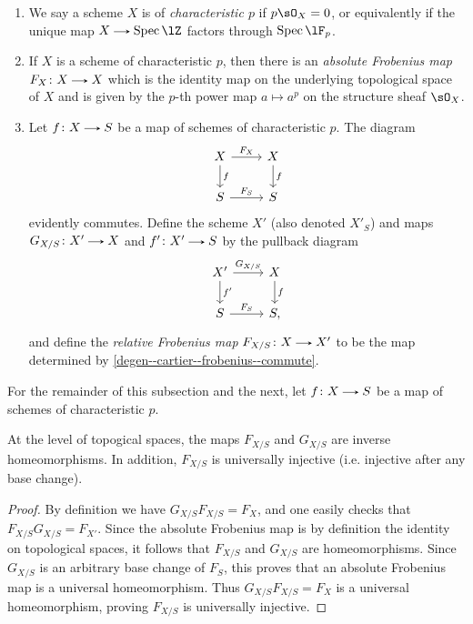 \begin{definition}
  \label{degen--cartier--frobenius}
  \begin{enumerate}[leftmargin=*]
  \item We say a scheme $X$ is of \emph{characteristic $p$} if $p\sO_X = 0$, or equivalently if the unique map $X \to \Spec \lZ$ factors through $\Spec \lF_p$.
  \item If $X$ is a scheme of characteristic $p$, then there is an \emph{ absolute Frobenius map} $F_X \c X \to X$ which is the identity map on the underlying topological space of $X$ and is given by the $p$-th power map $a \mapsto a^p$ on the structure sheaf $\sO_X$.
  \item Let $f \c X \to S$ be a map of schemes of characteristic $p$. The diagram
    \begin{equation}
      \label{degen--cartier--frobenius--commute}
      \begin{tikzcd}
        X \ar[r, "F_X"] \ar[d, "f"] &
        X \ar[d, "f"] \\
        S \ar[r, "F_S"] &
        S
      \end{tikzcd}
    \end{equation}
    evidently commutes. Define the scheme $X'$ (also denoted $X'_S$) and maps $G_{X/S} \c X' \to X$ and $f' \c X' \to S$ by the pullback diagram
    \[
      \begin{tikzcd}
        X' \ar[r, "G_{X/S}"] \ar[d, "f'"] &
        X \ar[d, "f"] \\
        S \ar[r, "F_S"] &
        S,
      \end{tikzcd} 
    \]
    and define the \emph{relative Frobenius map} $F_{X/S} \c X \to X'$ to be the map determined by \cref{degen--cartier--frobenius--commute}.
  \end{enumerate}
\end{definition}

\begin{situation}
  For the remainder of this subsection and the next, let $f \c X \to S$ be a map of schemes of characteristic $p$.
\end{situation}

\begin{lemma}
  \label{degen--cartier--frobenius-homeo}
  At the level of topogical spaces, the maps $F_{X/S}$ and $G_{X/S}$ are inverse homeomorphisms. In addition, $F_{X/S}$ is universally injective (i.e. injective after any base change).
\end{lemma}

\begin{proof}
  By definition we have $G_{X/S}F_{X/S} = F_X$, and one easily checks that $F_{X/S}G_{X/S} = F_{X'}$. Since the absolute Frobenius map is by definition the identity on topological spaces, it follows that $F_{X/S}$ and $G_{X/S}$ are homeomorphisms. Since $G_{X/S}$ is an arbitrary base change of $F_S$, this proves that an absolute Frobenius map is a universal homeomorphism. Thus $G_{X/S}F_{X/S} = F_X$ is a universal homeomorphism, proving $F_{X/S}$ is universally injective.
\end{proof}

